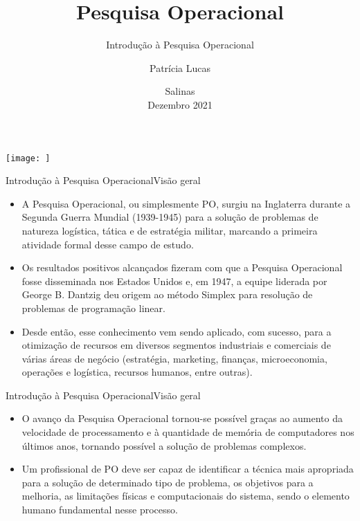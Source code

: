 \documentclass[t]{beamer}
\title[]{Pesquisa Operacional}
\subtitle[]{Introdução à Pesquisa Operacional}
\author[]{Patrícia Lucas\\{\footnotesize }}
\institute{Bacharelado em Sistemas de Informação \\ IFNMG  - Campus Salinas}
\date{\scriptsize Salinas\\Dezembro 2021}
\begin{document}
\begin{frame}

\begin{center}
\texttt{[image: ]}
\end{center}
  \titlepage
\end{frame}



\begin{ftst}{Introdução à Pesquisa Operacional}{Visão geral}
\small
\begin{itemize}
    \item A Pesquisa Operacional, ou simplesmente PO, surgiu na Inglaterra durante a Segunda Guerra Mundial (1939-1945) para a solução de problemas de natureza logística, tática e de estratégia militar, marcando a primeira atividade formal desse campo de estudo. 
    \vone
    \item Os resultados positivos alcançados fizeram com que a Pesquisa Operacional fosse disseminada nos Estados Unidos e, em 1947, a equipe liderada por George B. Dantzig deu origem ao método Simplex para resolução de problemas de programação linear.
    \vone
    \item Desde então, esse conhecimento vem sendo aplicado, com sucesso, para a otimização de recursos em diversos segmentos industriais e comerciais de várias áreas de negócio (estratégia, marketing, finanças, microeconomia, operações e logística, recursos humanos, entre outras).
\end{itemize}

\end{ftst}


\begin{ftst}{Introdução à Pesquisa Operacional}{Visão geral}
\begin{itemize}
    \item O avanço da Pesquisa Operacional tornou-se possível graças ao aumento da velocidade de processamento e à quantidade de memória de computadores nos últimos anos, tornando possível a solução de problemas complexos. 
    \vone
    \item Um profissional de PO deve ser capaz de identificar a técnica mais apropriada para a solução de determinado tipo de problema, os objetivos para a melhoria, as limitações físicas e computacionais do sistema, sendo o elemento humano fundamental nesse processo.
\end{itemize}

\end{ftst}
\end{document}
